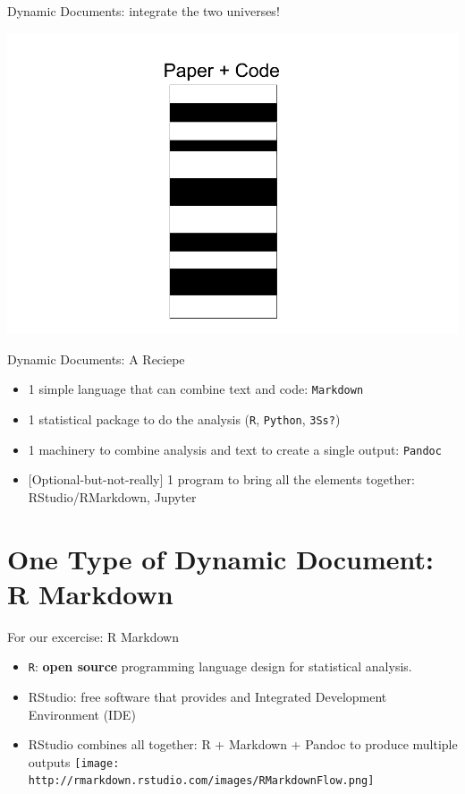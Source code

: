 \documentclass[ignorenonframetext,]{beamer}
\providecommand{\tightlist}{%
\setlength{\itemsep}{0pt}\setlength{\parskip}{0pt}}
\begin{document}
\begin{frame}{Dynamic Documents: integrate the two universes!}

\includegraphics{./One universe.png}

\end{frame}

\begin{frame}[fragile]{Dynamic Documents: A Reciepe}

\begin{itemize}
\tightlist
\item
  1 simple language that can combine text and code: \texttt{Markdown}
\item
  1 statistical package to do the analysis (\texttt{R}, \texttt{Python},
  \texttt{3S\textquotesingle{}s?})
\item
  1 machinery to combine analysis and text to create a single output:
  \texttt{Pandoc}
\item
  {[}Optional-but-not-really{]} 1 program to bring all the elements
  together: RStudio/RMarkdown, Jupyter
\end{itemize}

\end{frame}

\section{One Type of Dynamic Document: R
Markdown}\label{one-type-of-dynamic-document-r-markdown}

\begin{frame}[fragile]{For our excercise: R Markdown}

\begin{itemize}
\tightlist
\item
  \texttt{R}: \textbf{open source} programming language design for
  statistical analysis.\\
\item
  RStudio: free software that provides and Integrated Development
  Environment (IDE)\\
\item
  RStudio combines all together: R + Markdown + Pandoc to produce
  multiple outputs
  \texttt{[image: http://rmarkdown.rstudio.com/images/RMarkdownFlow.png]}
\end{itemize}

\end{frame}
\end{document}
